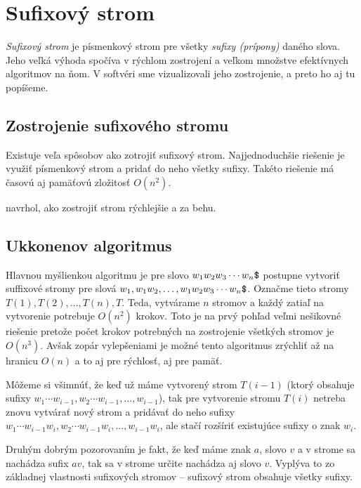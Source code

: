 \chapter{Sufixový strom}\label{chap:sx}

\emph{Sufixový strom} je písmenkový strom pre všetky \emph{sufixy (prípony)} 
daného slova. Jeho veľká výhoda spočíva v rýchlom zostrojení a veľkom množstve 
efektívnych algoritmov na ňom. V softvéri sme vizualizovali jeho zostrojenie, a 
preto ho aj tu popíšeme.

\section{Zostrojenie sufixového stromu}
Existuje veľa spôsobov ako zotrojiť sufixový strom. Najjednoduchšie riešenie 
je využiť písmenkový strom a pridať do neho všetky sufixy. Takéto riešenie má 
časovú aj pamäťovú zložitosť $O(n^2)$. 

\citet{ukkonen} navrhol, ako zostrojiť strom rýchlejšie a za behu. 

\section{Ukkonenov algoritmus}

Hlavnou myšlienkou algoritmu je pre slovo $w_1w_2w_3\cdots w_n\hbox{\tt\$}$ postupne 
vytvoriť suffixové stromy pre slová $w_1, w_1w_2,\ldots, 
w_1w_2w_3\cdots w_n\hbox{\tt\$}$. Označme tieto stromy $T(1), T(2),\ldots, T(n), T$. 
Teda, vytvárame $n$ stromov a každý zatiaľ na vytvorenie potrebuje $O(n^2)$ 
krokov. Toto je na prvý pohľad veľmi nešikovné riešenie pretože počet 
krokov potrebných na zostrojenie všetkých stromov je $O(n^3)$. 
Avšak zopár vylepšeniami je možné tento algoritmus zrýchliť až na hranicu 
$O(n)$ a to aj pre rýchlosť, aj pre pamäť. 


Môžeme si všimnúť, že keď už máme vytvorený strom 
$T(i-1)$ (ktorý obsahuje sufixy $w_1\cdots w_{i-1}, w_2\cdots w_{i-1}, \ldots, 
w_{i-1}$), tak pre vytvorenie stromu $T(i)$ netreba znovu vytvárať nový strom 
a pridávať do neho sufixy $w_1\cdots w_{i-1}w_i, w_2\cdots w_{i-1}w_i, \ldots, 
w_{i-1}w_i$, ale stačí rozšíriť existujúce sufixy o znak $w_i$.

Druhým dobrým pozorovaním je fakt, že keď máme znak $a$, slovo $v$ 
a v strome sa nachádza sufix $a v$, tak sa v strome určite 
nachádza aj slovo $v$. Vyplýva to zo základnej vlastnosti sufixových stromov 
--  sufixový strom obsahuje všetky sufixy.
 
